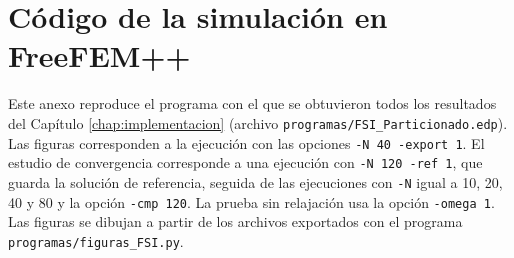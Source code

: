 \documentclass[12pt, letterpaper]{report}
\theoremstyle{definition}
\begin{document}
\appendix
\chapter{Código de la simulación en FreeFEM++}
\label{anexo:codigo}

{\sloppy
Este anexo reproduce el programa con el que se obtuvieron todos los resultados del Capítulo \ref{chap:implementacion} (archivo \texttt{programas/FSI\_Particionado.edp}). Las figuras corresponden a la ejecución con las opciones \texttt{-N 40 -export 1}. El estudio de convergencia corresponde a una ejecución con \texttt{-N 120 -ref 1}, que guarda la solución de referencia, seguida de las ejecuciones con \texttt{-N} igual a 10, 20, 40 y 80 y la opción \texttt{-cmp 120}. La prueba sin relajación usa la opción \texttt{-omega 1}. Las figuras se dibujan a partir de los archivos exportados con el programa \texttt{programas/figuras\_FSI.py}.\par}


\end{document}
